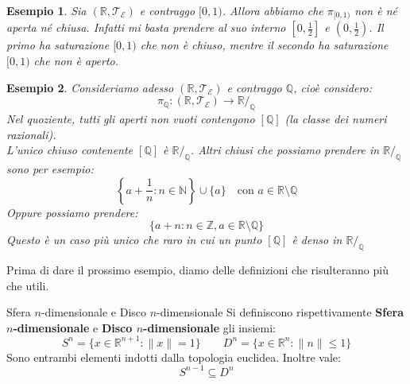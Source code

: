\documentclass[11pt,a4paper,twoside]{article}
\newtheorem{es}{Esempio}
\theoremstyle{definition}
\begin{document}
\begin{es}
	Sia $(\mathbb R, \mathcal T_\mathcal E)$ e contraggo $[0,1)$. Allora abbiamo che $\pi_{[0,1)}$ non è né aperta né chiusa. Infatti mi basta prendere al suo interno $[0,\frac 12]$ e $(0, \frac 12)$.
	Il primo ha saturazione $[0,1)$ che non è chiuso, mentre il secondo ha saturazione $[0,1)$ che non è aperto.
\end{es}

\begin{es}
	Consideriamo adesso $(\mathbb R, \mathcal T_\mathcal E)$ e contraggo $\mathbb Q$, cioè considero:
	\[ \pi_\mathbb Q: (\mathbb R,\mathcal T_\mathcal E) \to \mathbb R/_\mathbb Q \]
	Nel quoziente, tutti gli aperti non vuoti contengono $[\mathbb Q]$ (la classe dei numeri razionali).\\
	L'unico chiuso contenente $[\mathbb Q]$ è $\mathbb R/_\mathbb Q$. Altri chiusi che possiamo prendere in $\mathbb R/_\mathbb Q$ sono per esempio:
	\[ \left\{ a + \frac 1n : n \in \mathbb N \right\} \cup \{a\}\quad \text{con }a \in \mathbb R\setminus \mathbb Q\]
	Oppure possiamo prendere:
	\[ \{ a + n: n \in \mathbb Z, a \in \mathbb R\setminus \mathbb Q \} \]
	Questo è un caso più unico che raro in cui un punto $[\mathbb Q]$ è denso in $\mathbb R/_\mathbb Q$
\end{es}

Prima di dare il prossimo esempio, diamo delle definizioni che risulteranno più che utili.

\begin{defn}{Sfera $n$-dimensionale e Disco $n$-dimensionale}{}
	Si definiscono rispettivamente \textbf{Sfera $n$-dimensionale} e \textbf{Disco $n$-dimensionale} gli insiemi:
	\[ S^n = \{x \in \mathbb R^{n+1} : \|x\| = 1\} \qquad D^n = \{x \in \mathbb R^n : \|n\|\leq 1\}\]
	Sono entrambi elementi indotti dalla topologia euclidea. Inoltre vale:
	\[ S^{n-1}\subseteq D^n \]
\end{defn}
\end{document}
